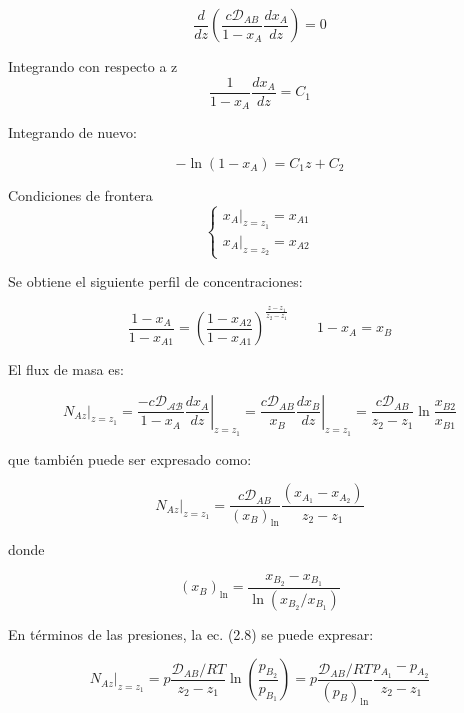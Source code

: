 \begin{equation}
	\frac{d}{dz} \left( \frac{c \mathcal{D}_{AB}}{1-x_A} \frac{dx_A}{dz} \right) = 0
\end{equation}

Integrando con respecto a z
$$
	\frac{1}{1-x_A} \frac{dx_A}{dz} = C_1
$$

Integrando de nuevo: 

\begin{equation}
- \ln{(1-x_A)} = C_1 z +C_2
\end{equation}

Condiciones de frontera 
\begin{equation}
	\left\{
	\begin{aligned}
	x_A |_{z=z_1} = x_{A1} \\
	x_A |_{z=z_2} = x_{A2}
	\end{aligned}
	\right.
\end{equation}

Se obtiene el siguiente perfil de concentraciones:

\begin{equation}
	\frac{1-x_A}{1-x_{A1}} = \left( \frac{1-x_{A2}}{1-x_{A1}} \right)^{\frac{z-z_1}{z_2-z_1}} 
	\qquad 
	1-x_A = x_B
\end{equation}

El flux de masa es:

\begin{equation}
N_{Az} |_{z=z_1} = \left. \frac{ - c \mathcal{D_{AB}}}{1-x_A} \frac{dx_A}{dz} \right|_{z=z_1} = \left. \frac{c \mathcal{D}_{AB}}{x_B} \frac{dx_B}{dz} \right|_{z=z_1} =  \frac{c \mathcal{D}_{AB}}{z_2 - z_1} \ln{\frac{x_{B2}}{x_{B1}}}
\end{equation}

que también puede ser expresado como: 

\begin{equation}
	N_{Az}|_{z=z_1} = \frac{c \mathcal{D}_{AB}}{(x_B)_{\ln{}}} \frac{(x_{A_1} - x_{A_2})}{z_2 - z_1}
\end{equation}

donde 

\begin{equation}
(x_B)_{\ln{}} = \frac{x_{B_2} - x_{B_1}}{\ln{(x_{B_2}/x_{B_1})}}
\end{equation}

En términos de las presiones, la ec. (2.8) se puede expresar: 

\begin{equation}
N_{Az}|_{z=z_1} = p \frac{\mathcal{D}_{AB}/RT}{z_2 - z_1} \ln{\left( \frac{p_{B_2}}{p_{B_1}}\right)} = p\frac{\mathcal{D}_{AB}/RT}{(p_B)_{\ln}} \frac{p_{A_1}-p_{A_2}}{z_2 - z_1}
\end{equation}


